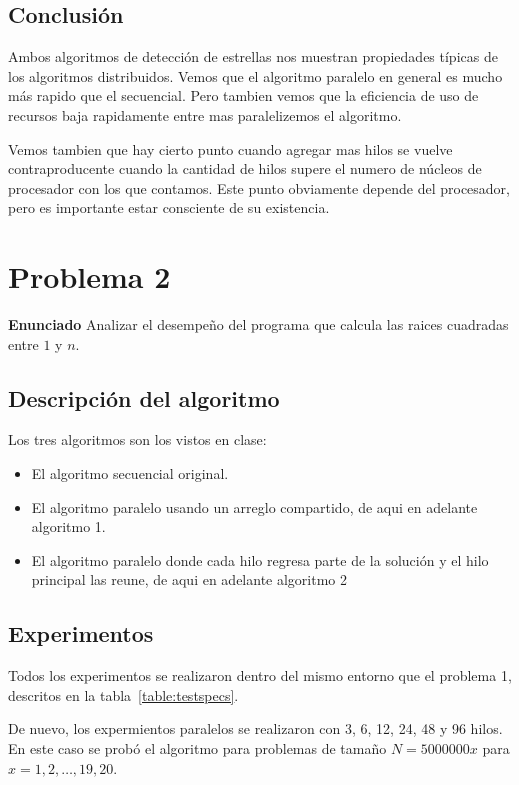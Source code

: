 \documentclass{report}
\begin{document}
\section{Conclusión}

Ambos algoritmos de detección de estrellas nos muestran propiedades típicas de los
algoritmos distribuidos. Vemos que el algoritmo paralelo en general es mucho más
rapido que el secuencial. Pero tambien vemos que la eficiencia de uso de recursos
baja rapidamente entre mas paralelizemos el algoritmo.

Vemos tambien que hay cierto punto cuando agregar mas hilos se vuelve
contraproducente cuando la cantidad de hilos supere el numero de núcleos de
procesador con los que contamos. Este punto obviamente depende del procesador, pero
es importante estar consciente de su existencia.

\chapter{Problema 2}

\textbf{Enunciado} Analizar el desempeño del programa que calcula las raices
cuadradas entre $1$ y $n$.

\section{Descripción del algoritmo}

Los tres algoritmos son los vistos en clase:

\begin{itemize}
  \item El algoritmo secuencial original.
  \item El algoritmo paralelo usando un arreglo compartido, de aqui en adelante
    algoritmo 1.
  \item El algoritmo paralelo donde cada hilo regresa parte de la solución y el
    hilo principal las reune, de aqui en adelante algoritmo 2
\end{itemize}

\section{Experimentos}

Todos los experimentos se realizaron dentro del mismo entorno que el problema 1,
descritos en la tabla~\ref{table:testspecs}.

De nuevo, los expermientos paralelos se realizaron con 3, 6, 12, 24, 48 y 96 hilos.
En este caso se prob\'o el algoritmo para problemas de tamaño $N = 5000000x$ para
$x = 1, 2, \ldots, 19, 20$.
\end{document}
